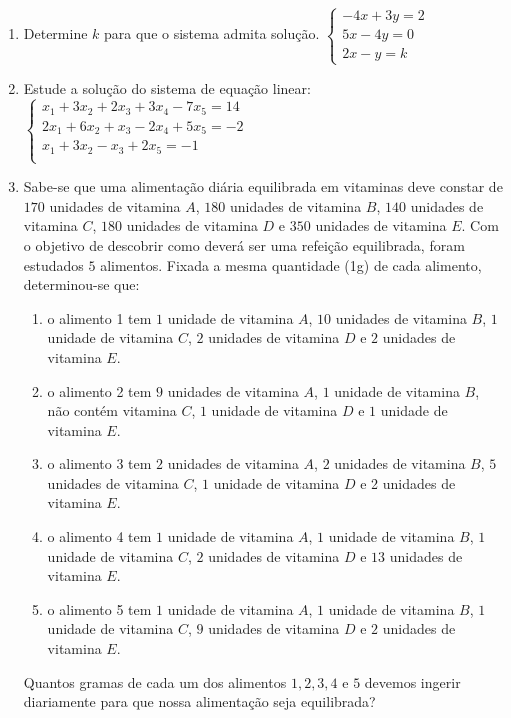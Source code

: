 \documentclass[oneside,a4paper,12pt]{article}
\begin{document}
\begin{enumerate}
	\item Determine $k$ para que o sistema admita solução. $\begin{cases}
	-4x + 3y = 2 \\
	5x - 4y = 0 \\
	2x - y = k
	\end{cases}$
	
	\item Estude a solução do sistema de equação linear:
	$\begin{cases}
	x_1 + 3x_2 + 2x_3 + 3x_4 - 7x_5 = 14 \\
	2x_1 + 6x_2 + x_3 - 2x_4 + 5x_5 = -2 \\
	x_1 + 3x_2 - x_3 + 2x_5 = -1 \\		
	\end{cases}$
	
	\item Sabe-se que uma alimentação diária equilibrada em vitaminas deve constar de $170$ unidades de vitamina $A$, $180$ unidades de vitamina $B$, $140$ unidades de vitamina $C$, $180$ unidades de vitamina $D$ e $350$ unidades de vitamina $E$. Com o objetivo de descobrir como deverá ser uma refeição equilibrada, foram estudados $5$ alimentos. Fixada a mesma quantidade (1g) de cada alimento, determinou-se que:
	\begin{enumerate}
		\item o alimento 1 tem $1$ unidade de vitamina $A$, $10$ unidades de vitamina $B$, $1$ unidade de vitamina $C$, $2$ unidades de vitamina $D$ e $2$ unidades de vitamina $E$.
		\item o alimento 2 tem $9$ unidades de vitamina $A$, $1$ unidade de vitamina $B$, não contém vitamina $C$, $1$ unidade de vitamina $D$ e $1$ unidade de vitamina $E$.
		\item o alimento 3 tem $2$ unidades de vitamina $A$, $2$ unidades de vitamina $B$, $5$ unidades de vitamina $C$, $1$ unidade de vitamina $D$ e 2 unidades de vitamina $E$.
		\item o alimento 4 tem $1$ unidade de vitamina $A$, $1$ unidade de vitamina $B$, $1$ unidade de vitamina $C$, $2$ unidades de vitamina $D$ e $13$ unidades de vitamina $E$.
		\item o alimento 5 tem $1$ unidade de vitamina $A$, $1$ unidade de vitamina $B$, $1$ unidade de vitamina $C$, $9$ unidades de vitamina $D$ e $2$ unidades de vitamina $E$.
	\end{enumerate}
	Quantos gramas de cada um dos alimentos $1,2,3,4$ e $5$ devemos ingerir diariamente para que nossa alimentação seja equilibrada?
	
\end{enumerate}

	
\end{document}

